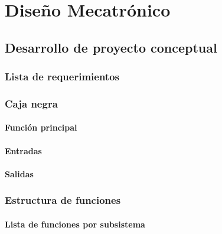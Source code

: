 

\doublespacing
\chapter{Diseño Mecatrónico}

\section{Desarrollo de proyecto conceptual}

\subsection{Lista de requerimientos}

\subsection{Caja negra}

\subsubsection{Función principal}

\subsubsection{Entradas}

\subsubsection{Salidas}

\subsection{Estructura de funciones}

\subsubsection{Lista de funciones por subsistema}

